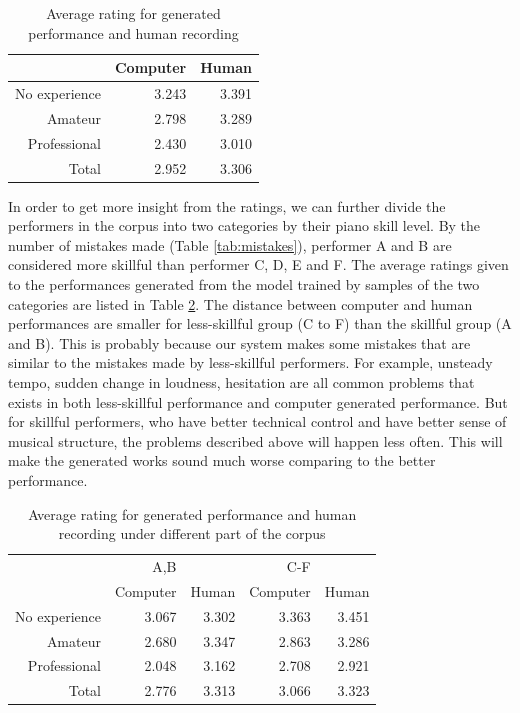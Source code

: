 \begin{table}
   \centering
   \caption{Average rating for generated performance and human recording}
   \label{tab:avg_rating}
   \begin{tabular}{r|rr}
      \hline
      &Computer &Human \\
      \hline
      No experience&3.243&3.391\\
      Amateur&2.798&3.289\\
      Professional&2.430&3.010\\
      \hline
      Total&2.952&3.306\\
      \hline
   \end{tabular}
\end{table}

In order to get more insight from the ratings, we can further divide the performers in the corpus into two categories by their piano skill level. By the number of mistakes made (Table \ref{tab:mistakes}), performer A and B are considered more skillful than performer C, D, E and F. The average ratings given to the performances generated from the model trained by samples of the two categories are listed in Table \ref{tab:good-bad_rating}. The distance between computer and human performances are smaller for less-skillful group (C to F) than the skillful group (A and B). This is probably because our system makes some mistakes that are similar to the mistakes made by less-skillful performers. For example, unsteady tempo, sudden change in loudness, hesitation are all common problems that exists in both less-skillful performance and computer generated performance. But for skillful performers, who have better technical control and have better sense of musical structure, the problems described above will happen less often. This will make the generated works sound much worse comparing to the better performance.%

\begin{table}
   \centering
   \caption{Average rating for generated performance and human recording under different part of the corpus}
   \label{tab:good-bad_rating}
   \begin{tabular}{r|rr|rr}
\hline
&A,B&&C-F&\\
&Computer &Human &Computer &Human \\
\hline
No experience&3.067&3.302&3.363&3.451\\
Amateur&2.680&3.347&2.863&3.286\\
Professional&2.048&3.162&2.708&2.921\\
\hline
Total&2.776&3.313&3.066&3.323\\
\hline
   \end{tabular}
\end{table}

